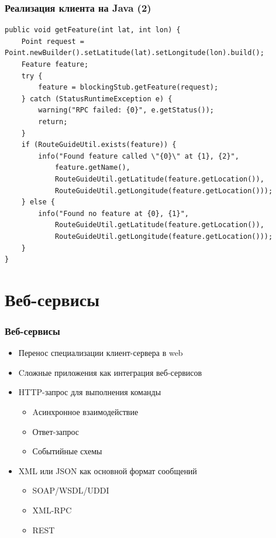 \documentclass[xetex,mathserif,serif]{beamer}
\begin{document}
	\begin{frame}[fragile]
		\frametitle{Реализация клиента на Java (2)}
		\begin{scriptsize}
			\begin{verbatim}
public void getFeature(int lat, int lon) {
    Point request = Point.newBuilder().setLatitude(lat).setLongitude(lon).build();
    Feature feature;
    try {
        feature = blockingStub.getFeature(request);
    } catch (StatusRuntimeException e) {
        warning("RPC failed: {0}", e.getStatus());
        return;
    }
    if (RouteGuideUtil.exists(feature)) {
        info("Found feature called \"{0}\" at {1}, {2}",
            feature.getName(),
            RouteGuideUtil.getLatitude(feature.getLocation()),
            RouteGuideUtil.getLongitude(feature.getLocation()));
    } else {
        info("Found no feature at {0}, {1}",
            RouteGuideUtil.getLatitude(feature.getLocation()),
            RouteGuideUtil.getLongitude(feature.getLocation()));
    }
}
			\end{verbatim}
		\end{scriptsize}
	\end{frame}

	\section{Веб-сервисы}

	\begin{frame}
		\frametitle{Веб-сервисы}
		\begin{itemize}
			\item Перенос специализации клиент-сервера в web
			\item Cложные приложения как интеграция веб-сервисов
			\item HTTP-запрос для выполнения команды
			\begin{itemize}
				\item Aсинхронное взаимодействие
				\item Ответ-запрос
				\item Событийные схемы
			\end{itemize}
			\item XML или JSON как основной формат сообщений
			\begin{itemize}
				\item SOAP/WSDL/UDDI
				\item XML-RPC
				\item REST
			\end{itemize}
		\end{itemize}
	\end{frame}
\end{document}

